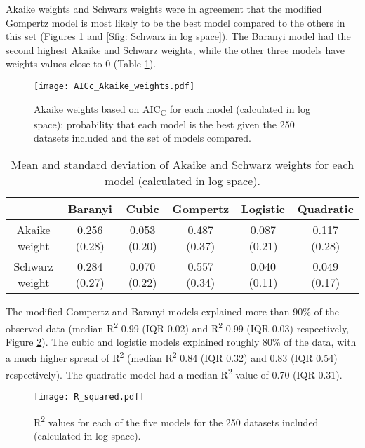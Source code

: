 \documentclass[11pt]{article}
\begin{document}
\begin{linenumbers}
        Akaike weights and Schwarz weights were in agreement that the modified Gompertz model is most likely to be the best model compared to the others in this set (Figures \ref{fig: Akaike in log space} and \ref{Sfig: Schwarz in log space}). The Baranyi model had the second highest Akaike and Schwarz weights, while the other three models have weights values close to 0 (Table \ref{table: Akaike and Schwarz weights}).
        
        \begin{figure}[ht!]
            \centering
            \texttt{[image: AICc\_Akaike\_weights.pdf]}
            \caption{Akaike weights based on AIC\textsubscript{C} for each model (calculated in log space); probability that each model is the best given the 250 datasets included and the set of models compared.}
            \label{fig: Akaike in log space}
        \end{figure}
        
        \begin{table}[ht!]
        \caption{Mean and standard deviation of Akaike and Schwarz weights for each model (calculated in log space).}
        \begin{center}
        \begin{tabular}{c||c|c|c|c|c}
             & Baranyi & Cubic & Gompertz & Logistic & Quadratic\\
            \hline
            \hline
            Akaike weight & 0.256 (0.28) & 0.053 (0.20) & 0.487 (0.37) & 0.087 (0.21) & 0.117 (0.28) \\
            Schwarz weight & 0.284 (0.27) & 0.070 (0.22) & 0.557 (0.34) & 0.040 (0.11) & 0.049 (0.17)
        \end{tabular}
        \end{center}
        \label{table: Akaike and Schwarz weights}
        \end{table}

        The modified Gompertz and Baranyi models explained more than 90\% of the observed data (median R\textsuperscript{2} 0.99 (IQR 0.02) and R\textsuperscript{2} 0.99 (IQR 0.03) respectively, Figure \ref{fig: R squared}). The cubic and logistic models explained roughly 80\% of the data, with a much higher spread of R\textsuperscript{2} (median R\textsuperscript{2} 0.84 (IQR 0.32) and 0.83 (IQR 0.54) respectively). The quadratic model had a median R\textsuperscript{2} value of 0.70 (IQR 0.31). 
        
        \begin{figure}[ht!]
            \centering
            \texttt{[image: R\_squared.pdf]}
            \caption{R\textsuperscript{2} values for each of the five models for the 250 datasets included (calculated in log space).}
            \label{fig: R squared}
        \end{figure}
        

\end{linenumbers}
\end{document}
